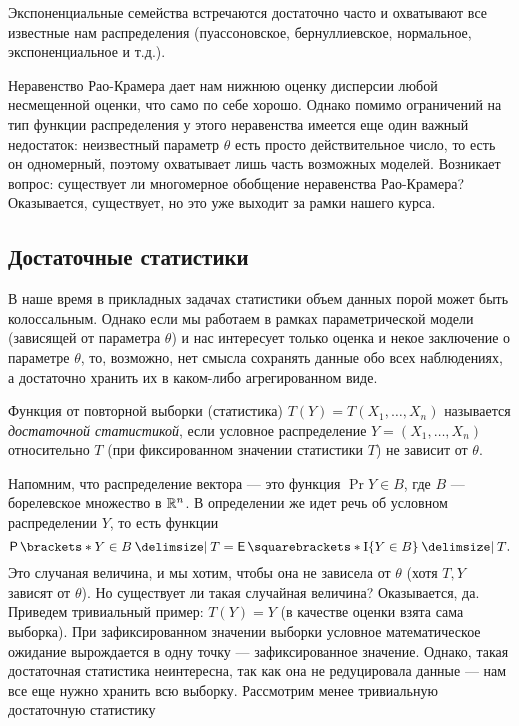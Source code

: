 Экспоненциальные семейства встречаются достаточно часто и охватывают все известные нам распределения (пуассоновское, бернуллиевское, нормальное, экспоненциальное и т.д.).

Неравенство Рао-Крамера дает нам нижнюю оценку дисперсии любой несмещенной оценки, что само по себе хорошо. Однако помимо ограничений на тип функции распределения у этого неравенства имеется еще один важный недостаток: неизвестный параметр $\theta$ есть просто действительное число, то есть он одномерный, поэтому охватывает лишь часть возможных моделей. Возникает вопрос: существует ли многомерное обобщение неравенства Рао-Крамера? Оказывается, существует, но это уже выходит за рамки нашего курса.

\subsection{Достаточные статистики}

В наше время в прикладных задачах статистики объем данных порой может быть колоссальным. Однако если мы работаем в рамках параметрической модели (зависящей от параметра $\theta$) и нас интересует только оценка и некое заключение о параметре $\theta$, то, возможно, нет смысла сохранять данные обо всех наблюдениях, а достаточно хранить их в каком-либо агрегированном виде.

\begin{definition}
    Функция от повторной выборки (статистика) $T(Y) = T(X_1, \ldots, X_n)$ называется \emph{достаточной статистикой}, если условное распределение $Y = (X_1, \ldots, X_n)$ относительно $T$ (при фиксированном значении статистики $T$) не зависит от $\theta$.
\end{definition}

Напомним, что распределение вектора --- это функция $\Pr{Y \in B}$, где $B$ --- борелевское множество в $\mathbb{R}^n$. В определении же идет речь об условном распределении $Y$, то есть функции
\[
    \Pr{Y \in B \given T} = \E{\mathrm{I}\{Y \in B\} \given T}.
\]
Это случаная величина, и мы хотим, чтобы она не зависела от $\theta$ (хотя $T, Y$ зависят от $\theta$). Но существует ли такая случайная величина? Оказывается, да. Приведем тривиальный пример: $T(Y) = Y$ (в качестве оценки взята сама выборка). При зафиксированном значении выборки условное математическое ожидание вырождается в одну точку --- зафиксированное значение. Однако, такая достаточная статистика неинтересна, так как она не редуцировала данные --- нам все еще нужно хранить всю выборку. Рассмотрим менее тривиальную достаточную статистику

